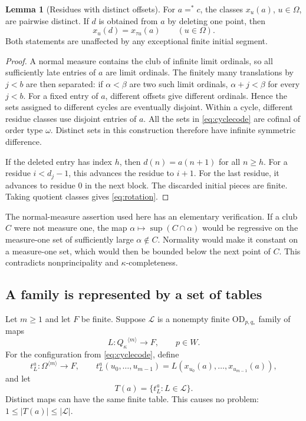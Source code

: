\documentclass[11pt,letterpaper]{article}
\theoremstyle{definition}
\newtheorem{lemma}[definition]{Lemma}
\numberwithin{equation}{section}
\newcommand{\OD}{\mathrm{OD}}
\newcommand{\ttuple}[2]{{#1}^{\langle #2\rangle}}
\begin{document}
\begin{lemma}[Residues with distinct offsets]\label{lem:cycles}
For $a=^*c$, the classes $x_u(a)$, $u\in\Omega$, are pairwise distinct.
If $d$ is obtained from $a$ by deleting one point, then
\begin{equation}\label{eq:rotation}
                        x_u(d)=x_{\tau u}(a)
                        \qquad(u\in\Omega).
\end{equation}
Both statements are unaffected by any exceptional finite initial segment.
\end{lemma}

\begin{proof}
A normal measure contains the club of infinite limit ordinals, so all
sufficiently late entries of $a$ are limit ordinals. The finitely many
translations by $j<b$ are then separated: if $\alpha<\beta$ are two such
limit ordinals, $\alpha+j<\beta$ for every $j<b$. For a fixed entry of $a$,
different offsets give different ordinals. Hence the sets assigned to
different cycles are eventually disjoint. Within a cycle, different
residue classes use disjoint entries of $a$. All the sets in
\eqref{eq:cyclecode} are cofinal of order type $\omega$. Distinct sets in
this construction therefore have infinite symmetric difference.

If the deleted entry has index $h$, then $d(n)=a(n+1)$ for all $n\ge h$.
For a residue $i<d_j-1$, this advances the residue to $i+1$. For the last
residue, it advances to residue $0$ in the next block. The discarded initial
pieces are finite. Taking quotient classes gives \eqref{eq:rotation}.
\end{proof}

The normal-measure assertion used here has an elementary verification. If a
club $C$ were not measure one, the map
$\alpha\mapsto\sup(C\cap\alpha)$ would be regressive on the measure-one set
of sufficiently large $\alpha\notin C$. Normality would make it constant on
a measure-one set, which would then be bounded below the next point of $C$.
This contradicts nonprincipality and $\kappa$-completeness.

\subsection{A family is represented by a set of tables}

Let $m\ge1$ and let $F$ be finite. Suppose $\mathscr L$ is a nonempty finite
$\OD_{p,q_*}$ family of maps
\[
                         L:\ttuple{Q_\kappa}{m}\longrightarrow F,
                         \qquad p\in W.
\]
For the configuration from \eqref{eq:cyclecode}, define
\[
 t_L^a:\ttuple{\Omega}{m}\longrightarrow F,
 \qquad
 t_L^a(u_0,\ldots,u_{m-1})
     =L(x_{u_0}(a),\ldots,x_{u_{m-1}}(a)),
\]
and let
\[
                       T(a)=\{t_L^a:L\in\mathscr L\}.
\]
Distinct maps can have the same finite table. This causes no problem:
$1\le |T(a)|\le |\mathscr L|$.
\end{document}
